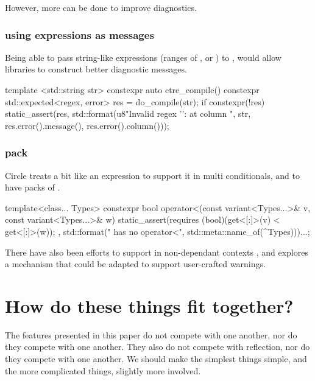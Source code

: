 \documentclass{wg21}
\begin{document}
However, more can be done to improve diagnostics.

\subsubsection{ using expressions as messages}

Being able to pass string-like expressions (ranges of , or ) to ,
would allow libraries to construct better diagnostic messages.

\begin{colorblock}
template <std::string str>
constexpr auto ctre_compile() {
   constexpr std::expected<regex, error> res = do_compile(str);
   if constexpr(!res) {
       static_assert(res, std::format(u8"Invalid regex '{}': {} at column {}",
                                      str, res.error().message(), res.error().column()));
   }
}
\end{colorblock}

\subsubsection{ pack}

Circle treats  a bit like an expression to support it in multi conditionals, and to have packs of .

\begin{colorblock}
template<class... Types>
constexpr bool operator<(const variant<Types...>& v,  const variant<Types...>& w) {
    static_assert(requires{ (bool)(get<[:]>(v) < get<[:]>(w)); },
        std::format("{} has no operator<", std::meta::name_of(^Types)))...;
}
\end{colorblock}

There have also been efforts to support  in non-dependant contexts ,
and  explores a mechanism that could be adapted to support user-crafted warnings.

\section{How do these things fit together?}

The features presented in this paper do not compete with one another, nor do they compete with one another.
They also do not compete with reflection, nor do they compete with one another.
We should make the simplest things simple, and the more complicated things, slightly more involved.
\end{document}
